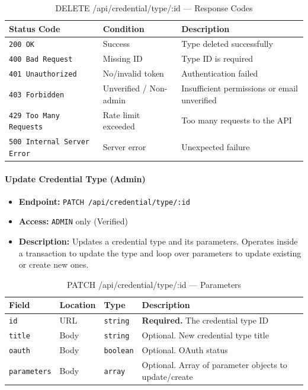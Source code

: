 \begin{table}[H]
\centering
\renewcommand{\arraystretch}{1.3}
\begin{tabularx}{\textwidth}{|l|l|X|}
\hline
\textbf{Status Code} & \textbf{Condition} & \textbf{Description} \\
\hline
\texttt{200 OK}           & Success              & Type deleted successfully \\
\hline
\texttt{400 Bad Request}  & Missing ID           & Type ID is required \\
\hline
\texttt{401 Unauthorized} & No/invalid token     & Authentication failed \\
\hline
\texttt{403 Forbidden}    & Unverified / Non-admin & Insufficient permissions or email unverified \\
\hline
\texttt{429 Too Many Requests} & Rate limit exceeded & Too many requests to the API \\
\hline
\texttt{500 Internal Server Error} & Server error & Unexpected failure \\
\hline
\end{tabularx}
\caption{DELETE /api/credential/type/:id — Response Codes}
\label{tab:delete-credential-type-responses}
\end{table}
\FloatBarrier

\paragraph{Update Credential Type (Admin)}
\label{subsubsec:update-credential-type}

\begin{itemize}
  \item \textbf{Endpoint:} \texttt{PATCH /api/credential/type/:id}
  \item \textbf{Access:} \texttt{ADMIN} only (Verified)
  \item \textbf{Description:} Updates a credential type and its parameters.
  Operates inside a transaction to update the type and loop over parameters to update existing or create new ones.
\end{itemize}

\begin{table}[H]
\centering
\renewcommand{\arraystretch}{1.3}
\begin{tabularx}{\textwidth}{|l|l|l|X|}
\hline
\textbf{Field} & \textbf{Location} & \textbf{Type} & \textbf{Description} \\
\hline
\texttt{id}          & URL  & \texttt{string}  & \textbf{Required.} The credential type ID \\
\hline
\texttt{title}       & Body & \texttt{string}  & Optional. New credential type title \\
\hline
\texttt{oauth}       & Body & \texttt{boolean} & Optional. OAuth status \\
\hline
\texttt{parameters}  & Body & \texttt{array}   & Optional. Array of parameter objects to update/create \\
\hline
\end{tabularx}
\caption{PATCH /api/credential/type/:id — Parameters}
\label{tab:update-credential-type-params}
\end{table}

